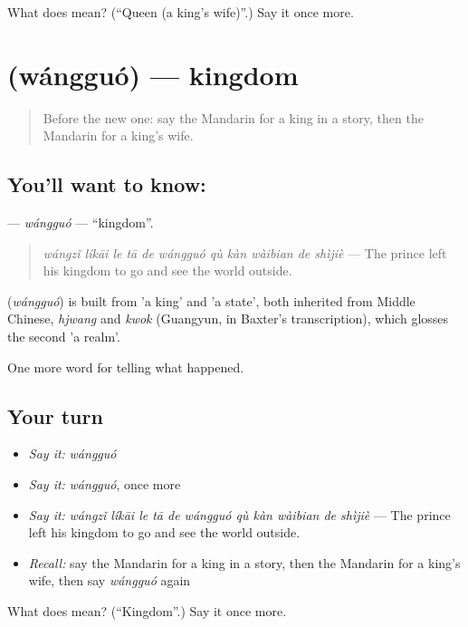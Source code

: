 \begin{tcolorbox}[breakable,colback=teal!4,colframe=teal!35!black,title={Before you move on}]
What does  mean? (\textquotedblleft{}Queen (a king's wife)\textquotedblright{}.) Say it once more.
\end{tcolorbox}
\section[\texorpdfstring{\zh{王国} (wángguó)}{王国 (wángguó)}]{ (wángguó) — kingdom}

\label{lesson:ZH-C330-wangguo}



\begin{quote}
Before the new one: say the Mandarin for a king in a story, then the Mandarin for a king's wife.
\end{quote}

\subsection*{You'll want to know: }
\textbf{} — \emph{wángguó} — \textquotedblleft{}kingdom\textquotedblright{}.

\begin{quote}
\textbf{} \emph{wángzǐ líkāi le tā de wángguó qù kàn wàibian de shìjiè} — The prince left his kingdom to go and see the world outside.
\end{quote}

\begin{cousinweb}
\textbf{} (\emph{wángguó}) is built from  'a king' and  'a state', both inherited from Middle Chinese, \emph{hjwang} and \emph{kwok} (Guangyun, in Baxter's transcription), which glosses the second 'a realm'.
\end{cousinweb}

\begin{grammarlens}[title={What you've built}]
One more word for telling what happened.
\end{grammarlens}

\subsection*{Your turn}
\begin{itemize}
\raggedright
  \item \emph{Say it:} \emph{wángguó}
  \item \emph{Say it:} \emph{wángguó}, once more
  \item \emph{Say it:} \emph{wángzǐ líkāi le tā de wángguó qù kàn wàibian de shìjiè} — The prince left his kingdom to go and see the world outside.
  \item \emph{Recall:} say the Mandarin for a king in a story, then the Mandarin for a king's wife, then say \emph{wángguó} again
\end{itemize}

\begin{tcolorbox}[breakable,colback=teal!4,colframe=teal!35!black,title={Before you move on}]
What does  mean? (\textquotedblleft{}Kingdom\textquotedblright{}.) Say it once more.
\end{tcolorbox}
